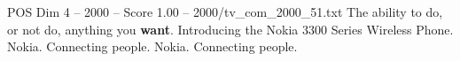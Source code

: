 \begin{textsample}{POS Dim 4 – 2000 – Score 1.00 – 2000/tv\_com\_2000\_51.txt}  \label{ex:f4_pos_079}
The ability to do, or not do, anything you \textbf{want}.
Introducing the Nokia 3300 Series Wireless Phone.
Nokia.
Connecting people.
Nokia.
Connecting people.

\end{textsample}
